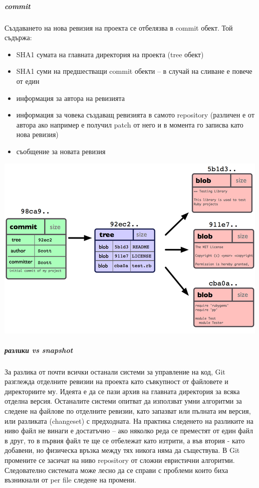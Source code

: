 \documentclass[a4paper]{article}
\begin{document}
      \subparagraph{commit}
      Създаването на нова ревизия на проекта се отбелязва в commit обект. Той съдържа:
      \begin{itemize}
        \item SHA1 сумата на главната директория на проекта (tree обект)
        \item SHA1 суми на предшестващи commit обекти -- в случай на сливане е повече от един
        \item информация за автора на ревизията
        \item информация за човека създаващ ревизията в самото repository
        (различен е от автора ако например е получил patch от него и в момента
        го записва като нова ревизия)
        \item съобщение за новата ревизия
      \end{itemize}

      \begin{center}
        \includegraphics[scale=1.0]{git_commit.png}
      \end{center}

      \subparagraph{разлики vs snapshot} За разлика от почти всички останали
      системи за управление на код, Git разглежда отделните ревизии на проекта
      като съвкупност от файловете и директориите му. Идеята е да се пази архив
      на главната директория за всяка отделна версия. Останалите системи
      опитват да използват умни алгоритми за следене на файлове по отделните
      ревизии, като запазват или пълната им версия, или
      разликата (changeset) с предходната. На практика следенето на
      разликите на ниво файл не винаги е достатъчно -- ако няколко реда се
      преместят от един файл в друг, то в първия файл те ще се отбележат като
      изтрити, а във втория - като добавени, но физическа връзка между тях
      никога няма да съществува. В Git промените се засичат на ниво repository
      от сложни евристични алгоритми. Следователно системата може лесно да се
      справи с проблеми които биха възникнали от per file следене на промени.
\end{document}
